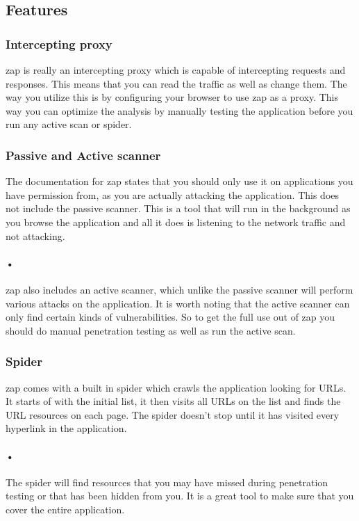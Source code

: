 \documentclass[11pt,english,a4paper]{report}
\begin{document}
\subsection{Features}
\subsubsection{Intercepting proxy}
\gls{zap} is really an intercepting proxy which is capable of intercepting requests and responses. This means that you can read the traffic as well as change them. The way you utilize this is by configuring your browser to use \gls{zap} as a proxy. This way you can optimize the analysis by manually testing the application before you run any active scan or spider.
\subsubsection{Passive and Active scanner}
The documentation for \gls{zap} states that you should only use it on applications you have permission from, as you are actually attacking the application. 
This does not include the passive scanner. This is a tool that will run in the background as you browse the application and all it does is listening to the network traffic and not attacking. 
\paragraph{•}
\gls{zap} also includes an active scanner, which unlike the passive scanner will perform various attacks on the application. It is worth noting that the active scanner can only find certain kinds of vulnerabilities. So to get the full use out of \gls{zap} you should do manual penetration testing as well as run the active scan.
\subsubsection{Spider}
\gls{zap} comes with a built in spider which crawls the application looking for URLs. It starts of with the initial list, it then visits all URLs on the list and finds the URL resources on each page. The spider doesn't stop until it has visited every hyperlink in the application.
\paragraph{•}
The spider will find resources that you may have missed during penetration testing or that has been hidden from you. It is a great tool to make sure that you cover the entire application.
\end{document}
